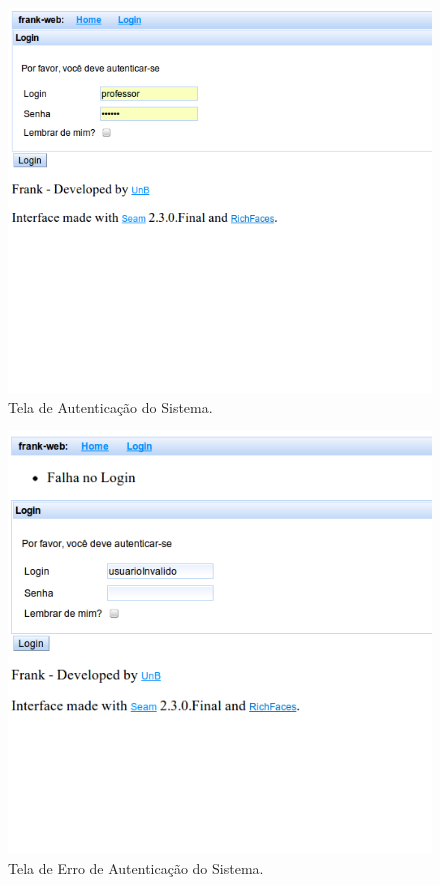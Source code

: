 \begin{figure}
	\centering
	\includegraphics[scale=0.6]{images/frank-tela-aluno-login.png}
	\caption{Tela de Autenticação do Sistema.}
	\label{fig:frank-tela-aluno-login}
\end{figure}

\begin{figure}
	\centering
	\includegraphics[scale=0.6]{images/frank-tela-login-invalido.png}
	\caption{Tela de Erro de Autenticação do Sistema.}
	\label{fig:frank-tela-login-invalido}
\end{figure}

